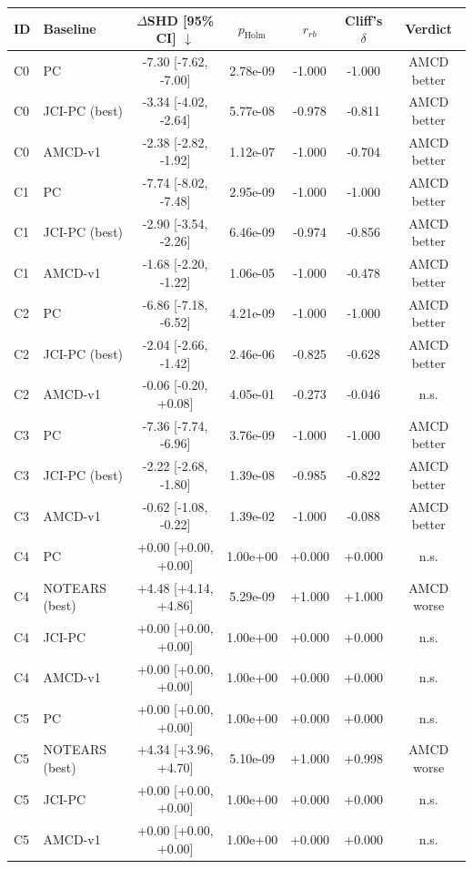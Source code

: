 \begin{tabular}{llccccc}
\toprule
ID & Baseline & $\Delta$SHD [95\% CI] $\downarrow$ & $p_{\mathrm{Holm}}$ & $r_{rb}$ & Cliff's $\delta$ & Verdict \\
\midrule
C0 & PC & -7.30 [-7.62, -7.00] & 2.78e-09 & -1.000 & -1.000 & AMCD better \\
C0 & JCI-PC (best) & -3.34 [-4.02, -2.64] & 5.77e-08 & -0.978 & -0.811 & AMCD better \\
C0 & AMCD-v1 & -2.38 [-2.82, -1.92] & 1.12e-07 & -1.000 & -0.704 & AMCD better \\
C1 & PC & -7.74 [-8.02, -7.48] & 2.95e-09 & -1.000 & -1.000 & AMCD better \\
C1 & JCI-PC (best) & -2.90 [-3.54, -2.26] & 6.46e-09 & -0.974 & -0.856 & AMCD better \\
C1 & AMCD-v1 & -1.68 [-2.20, -1.22] & 1.06e-05 & -1.000 & -0.478 & AMCD better \\
C2 & PC & -6.86 [-7.18, -6.52] & 4.21e-09 & -1.000 & -1.000 & AMCD better \\
C2 & JCI-PC (best) & -2.04 [-2.66, -1.42] & 2.46e-06 & -0.825 & -0.628 & AMCD better \\
C2 & AMCD-v1 & -0.06 [-0.20, +0.08] & 4.05e-01 & -0.273 & -0.046 & n.s. \\
C3 & PC & -7.36 [-7.74, -6.96] & 3.76e-09 & -1.000 & -1.000 & AMCD better \\
C3 & JCI-PC (best) & -2.22 [-2.68, -1.80] & 1.39e-08 & -0.985 & -0.822 & AMCD better \\
C3 & AMCD-v1 & -0.62 [-1.08, -0.22] & 1.39e-02 & -1.000 & -0.088 & AMCD better \\
C4 & PC & +0.00 [+0.00, +0.00] & 1.00e+00 & +0.000 & +0.000 & n.s. \\
C4 & NOTEARS (best) & +4.48 [+4.14, +4.86] & 5.29e-09 & +1.000 & +1.000 & AMCD worse \\
C4 & JCI-PC & +0.00 [+0.00, +0.00] & 1.00e+00 & +0.000 & +0.000 & n.s. \\
C4 & AMCD-v1 & +0.00 [+0.00, +0.00] & 1.00e+00 & +0.000 & +0.000 & n.s. \\
C5 & PC & +0.00 [+0.00, +0.00] & 1.00e+00 & +0.000 & +0.000 & n.s. \\
C5 & NOTEARS (best) & +4.34 [+3.96, +4.70] & 5.10e-09 & +1.000 & +0.998 & AMCD worse \\
C5 & JCI-PC & +0.00 [+0.00, +0.00] & 1.00e+00 & +0.000 & +0.000 & n.s. \\
C5 & AMCD-v1 & +0.00 [+0.00, +0.00] & 1.00e+00 & +0.000 & +0.000 & n.s. \\

\end{tabular}

